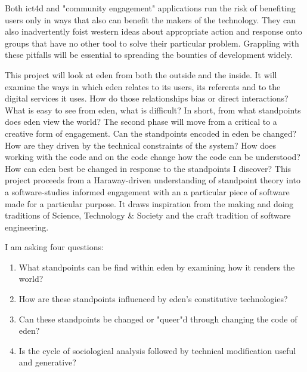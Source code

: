 \documentclass[a4paper,man,natbib]{apa6}
\begin{document}
   Both \acrshort{ict4d} and "community engagement" applications run the risk of benefiting users only in ways that also can benefit the makers of the technology. They can also inadvertently foist western ideas about appropriate action and response onto groups that have no other tool to solve their particular problem. Grappling with these pitfalls will be essential to spreading the bounties of development widely.

   This project will look at \acrshort{eden} from both the outside and the inside. It will examine the ways in which \acrshort{eden} relates to its users, its referents and to the digital services it uses. How do those relationships bias or direct interactions? What is easy to see from \acrshort{eden}, what is difficult? In short, from what standpoints does \acrshort{eden} view the world? 
   \medskip
   The second phase will move from a critical to a creative form of engagement. Can the standpoints encoded in \acrshort{eden} be changed? How are they driven by the technical constraints of the system? How does working with the code and on the code change how the code can be understood? How can \acrshort{eden} best be changed in response to the standpoints I discover?
   \medskip
   This project proceeds from a Haraway-driven understanding of standpoint theory into a software-studies informed engagement with an a particular piece of software made for a particular purpose. It draws inspiration from the making and doing traditions of Science, Technology \& Society and the craft tradition of software engineering.
   \par
   \begin{flushleft}
   I am asking four questions:
   \end{flushleft}
   \begin{enumerate}
     \item What standpoints can be find within \acrshort{eden} by examining how it renders the world?

     \item How are these standpoints influenced by \acrshort{eden}'s constitutive technologies?

     \item Can these standpoints be changed or "queer"d through changing the code of \acrshort{eden}?

     \item Is the cycle of sociological analysis followed by technical modification useful and generative?
   \end{enumerate}
\end{document}
